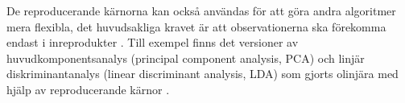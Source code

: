 \documentclass[a4paper, 12pt]{report}
\theoremstyle{definition}
\theoremstyle{remark}
\begin{document}
De reproducerande kärnorna kan också användas för att göra andra algoritmer mera flexibla, det huvudsakliga kravet är att observationerna ska förekomma endast i inreprodukter \cite{ESL}\cite{LearningKernels}. Till exempel finns det versioner av huvudkomponentsanalys (principal component analysis, PCA) och linjär diskriminantanalys (linear discriminant analysis, LDA) som gjorts olinjära med hjälp av reproducerande kärnor \cite{ESL}.



\end{document}
